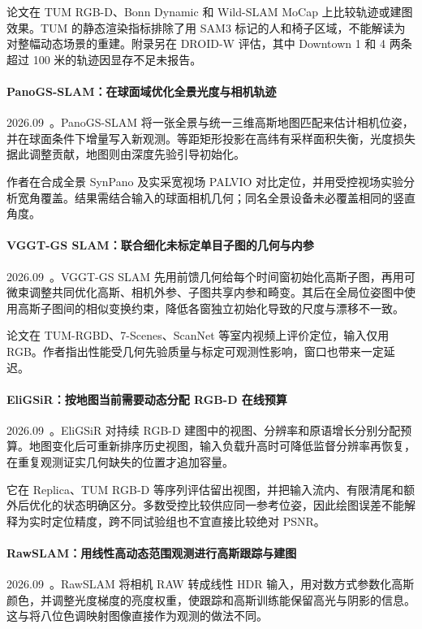 论文在 TUM RGB-D、Bonn Dynamic 和 Wild-SLAM MoCap 上比较轨迹或建图效果。TUM 的静态渲染指标排除了用 SAM3 标记的人和椅子区域，不能解读为对整幅动态场景的重建。附录另在 DROID-W 评估，其中 Downtown 1 和 4 两条超过 100 米的轨迹因显存不足未报告。

\paragraph{PanoGS-SLAM：在球面域优化全景光度与相机轨迹}
2026.09~\cite{2609_17387}。PanoGS-SLAM 将一张全景与统一三维高斯地图匹配来估计相机位姿，并在球面条件下增量写入新观测。等距矩形投影在高纬有采样面积失衡，光度损失据此调整贡献，地图则由深度先验引导初始化。

作者在合成全景 SynPano 及实采宽视场 PALVIO 对比定位，并用受控视场实验分析宽角覆盖。结果需结合输入的球面相机几何；同名全景设备未必覆盖相同的竖直角度。

\paragraph{VGGT-GS SLAM：联合细化未标定单目子图的几何与内参}
2026.09~\cite{2609_19628}。VGGT-GS SLAM 先用前馈几何给每个时间窗初始化高斯子图，再用可微束调整共同优化高斯、相机外参、子图共享内参和畸变。其后在全局位姿图中使用高斯子图间的相似变换约束，降低各窗独立初始化导致的尺度与漂移不一致。

论文在 TUM-RGBD、7-Scenes、ScanNet 等室内视频上评价定位，输入仅用 RGB。作者指出性能受几何先验质量与标定可观测性影响，窗口也带来一定延迟。

\paragraph{EliGSiR：按地图当前需要动态分配 RGB-D 在线预算}
2026.09~\cite{2609_20348}。EliGSiR 对持续 RGB-D 建图中的视图、分辨率和原语增长分别分配预算。地图变化后可重新排序历史视图，输入负载升高时可降低监督分辨率再恢复，在重复观测证实几何缺失的位置才追加容量。

它在 Replica、TUM RGB-D 等序列评估留出视图，并把输入流内、有限清尾和额外后优化的状态明确区分。多数受控比较供应同一参考位姿，因此绘图误差不能解释为实时定位精度，跨不同试验组也不宜直接比较绝对 PSNR。

\paragraph{RawSLAM：用线性高动态范围观测进行高斯跟踪与建图}
2026.09~\cite{2609_20589}。RawSLAM 将相机 RAW 转成线性 HDR 输入，用对数方式参数化高斯颜色，并调整光度梯度的亮度权重，使跟踪和高斯训练能保留高光与阴影的信息。这与将八位色调映射图像直接作为观测的做法不同。

